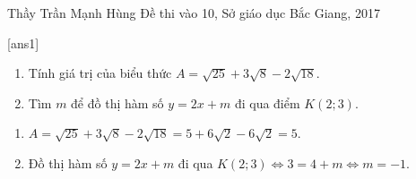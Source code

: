 \begin{name}
{Thầy  Trần Mạnh Hùng}
{Đề thi vào 10, Sở giáo dục Bắc Giang, 2017}
\end{name}
\setcounter{ex}{0}
[ans1]
\begin{ex}%
    \hfill
    \begin{enumerate}
        \item Tính giá trị của biểu thức $A=\sqrt{25}+3\sqrt{8}-2\sqrt{18}$.
        \item Tìm $m$ để đồ thị hàm số $y=2x+m$ đi qua điểm $K\left(2;3\right)$.
    \end{enumerate}
\loigiai
    {
    \begin{enumerate}
        \item $A=\sqrt{25}+3\sqrt{8}-2\sqrt{18}=5+6\sqrt{2}-6\sqrt{2}=5$.
        \item Đồ thị hàm số $y=2x+m$ đi qua $K\left(2;3\right)\Leftrightarrow 3=4+m\Leftrightarrow m=-1$.\\
    \end{enumerate}
    }
\end{ex}

